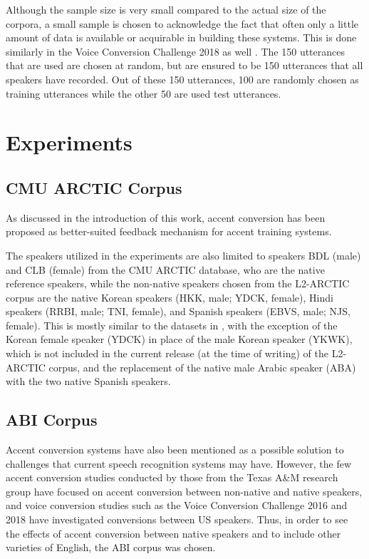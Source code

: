 \documentclass
[
    a4paper,
    twoside,
    12pt,
]
{report}
\begin{document}
Although the sample size is very small compared to the actual size of
the corpora, a small sample is chosen to acknowledge the fact that often
only a little amount of data is available or acquirable in building
these systems. This is done similarly in the Voice Conversion Challenge
2018 as well \cite{lorenzo-trueba2018}. The 150 utterances that are used
are chosen at random, but are ensured to be 150 utterances that all
speakers have recorded. Out of these 150 utterances, 100 are randomly
chosen as training utterances while the other 50 are used test
utterances.

\hypertarget{experiments}{%
\section{Experiments}\label{experiments}}

\hypertarget{cmu-arctic-corpus-1}{%
\subsection{CMU ARCTIC Corpus}\label{cmu-arctic-corpus-1}}

As discussed in the introduction of this work, accent conversion has
been proposed as better-suited feedback mechanism for accent training
systems.

The speakers utilized in the experiments are also limited to speakers
BDL (male) and CLB (female) from the CMU ARCTIC database, who are the
native reference speakers, while the non-native speakers chosen from the
L2-ARCTIC corpus are the native Korean speakers (HKK, male; YDCK,
female), Hindi speakers (RRBI, male; TNI, female), and Spanish speakers
(EBVS, male; NJS, female). This is mostly similar to the datasets in
\textcite{zhao2018a}, with the exception of the Korean female speaker
(YDCK) in place of the male Korean speaker (YKWK), which is not included
in the current release (at the time of writing) of the L2-ARCTIC corpus,
and the replacement of the native male Arabic speaker (ABA) with the two
native Spanish speakers.

\hypertarget{abi-corpus}{%
\subsection{ABI Corpus}\label{abi-corpus}}

Accent conversion systems have also been mentioned as a possible
solution to challenges that current speech recognition systems may have.
However, the few accent conversion studies conducted by those from the
Texas A\&M research group have focused on accent conversion between
non-native and native speakers, and voice conversion studies such as the
Voice Conversion Challenge 2016 and 2018 have investigated conversions
between US speakers. Thus, in order to see the effects of accent
conversion between native speakers and to include other varieties of
English, the ABI corpus was chosen.
\end{document}
